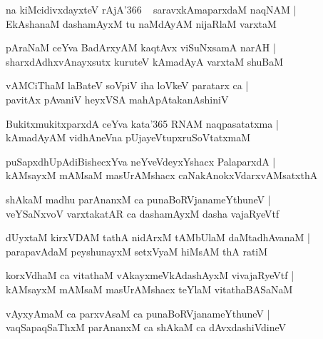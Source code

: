 \documentclass[twoside,12pt,openright]{book}
\newcounter{shloka}[chapter]
\begin{document}
\begin{shloka}%
na kiMcidivxdayxteV rAjA\char'366  ~ saravxkAmaparxdaM naqNAM |\\
EkAshanaM dashamAyxM tu naMdAyAM nijaRlaM varxtaM 
\end{shloka}

\begin{shloka}%
pAraNaM ceYva BadArxyAM kaqtAvx viSuNxsamA narAH |\\
sharxdAdhxvAnayxsutx kuruteV kAmadAyA varxtaM shuBaM 
\end{shloka}

\begin{shloka}%
vAMCiThaM laBateV soVpiV iha loVkeV paratarx ca |\\
pavitAx pAvaniV heyxVSA mahApAtakanAshiniV 
\end{shloka}

\begin{shloka}%
BukitxmukitxparxdA ceYva kata\char'365 RNAM naqpasatatxma |\\
kAmadAyAM vidhAneVna pUjayeVtupxruSoVtatxmaM
\end{shloka}

\begin{shloka}%
puSapxdhUpAdiBishecxYva neYveVdeyxYshacx PalaparxdA |\\
kAMsayxM mAMsaM masUrAMshacx caNakAnokxVdarxvAMsatxthA 
\end{shloka}

\begin{shloka}%
shAkaM madhu parAnanxM ca punaBoRVjanameYthuneV |\\
veYSaNxvoV varxtakatAR ca dashamAyxM dasha vajaRyeVtf
\end{shloka}

\begin{shloka}%
dUyxtaM kirxVDAM tathA nidArxM tAMbUlaM daMtadhAvanaM |\\
parapavAdaM peyshunayxM setxVyaM hiMsAM  thA ratiM 
\end{shloka}

\begin{shloka}%
korxVdhaM ca vitathaM vAkayxmeVkAdashAyxM vivajaRyeVtf |\\
kAMsayxM mAMsaM masUrAMshacx teYlaM vitathaBASaNaM
\end{shloka}

\begin{shloka}%
vAyxyAmaM ca parxvAsaM ca punaBoRVjanameYthuneV |\\
vaqSapaqSaThxM parAnanxM ca shAkaM ca dAvxdashiVdineV 
\end{shloka}
\end{document}
